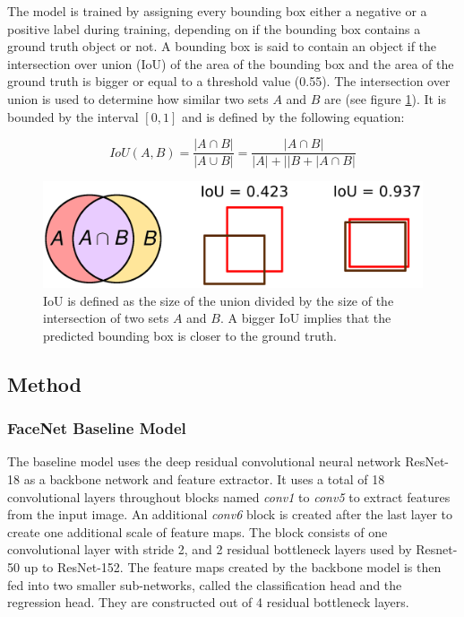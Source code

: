 \documentclass[a4paper, twoside]{article}
\begin{document}
The model is trained by assigning every bounding box either a negative or a positive label during training, depending on if the bounding box contains a ground truth object or not. A bounding box is said to contain an object if the intersection over union (IoU) \cite{iou} of the area of the bounding box and the area of the ground truth is bigger or equal to a threshold value (0.55). The intersection over union is used to determine how similar two sets $A$ and $B$ are (see figure \ref{figiou}). It is bounded by the interval $[0,1]$ and is defined by the following equation: 

\begin{equation}\label{eqiou}
IoU(A, B)=\frac{|A \cap B|}{|A \cup B|} = \frac{|A \cap B|}{|A|+||B+|A \cap B|}
\end{equation}

\begin{figure}[h]
	\centering
  		\includegraphics[width=14cm]{iou.png}
  	\caption{IoU \cite{iou} is defined as the size of the union divided by the size of the intersection of two sets $A$ and $B$. A bigger IoU implies that the predicted bounding box is closer to the ground truth. } \label{figiou}
\end{figure}

\subsection{Method}
\subsubsection{FaceNet Baseline Model}
The baseline model uses the deep residual convolutional neural network ResNet-18 \cite{resnet} as a backbone network and feature extractor. It uses a total of 18 convolutional layers throughout blocks named \textit{conv1} to \textit{conv5} to extract features from the input image. An additional \textit{conv6} block is created after the last layer to create one additional scale of feature maps. The block consists of one convolutional layer with stride 2, and 2 residual bottleneck layers used by Resnet-50 up to ResNet-152. The feature maps created by the backbone model is then fed into two smaller sub-networks, called the classification head and the regression head. They are constructed out of 4 residual bottleneck layers.
\end{document}
